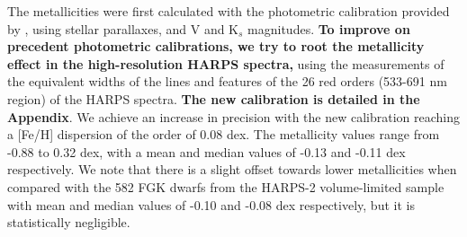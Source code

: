 \documentclass[structabstract]{aa}
\begin{document}
The metallicities were first calculated with the photometric calibration provided by \citet{Neves-2012}, using stellar parallaxes, and V and K$_{s}$ magnitudes. 
\textbf{To improve on precedent photometric calibrations, we try to root the metallicity effect in the high-resolution HARPS spectra,} using the measurements of the equivalent widths of the lines and features of the 26 red orders (533-691 nm region) of the HARPS spectra. \textbf{The new calibration is detailed in the Appendix}. We achieve an increase in precision with the new calibration reaching a [Fe/H] dispersion of the order of 0.08 dex. The metallicity values range from -0.88 to 0.32 dex, with a mean and median values of -0.13 and -0.11 dex respectively. We note that there is a slight offset towards lower metallicities when compared with the 582 FGK dwarfs from the HARPS-2 volume-limited sample \citep{Sousa-2011b} with mean and median values of -0.10 and -0.08 dex respectively, but it is statistically negligible.


\end{document}

